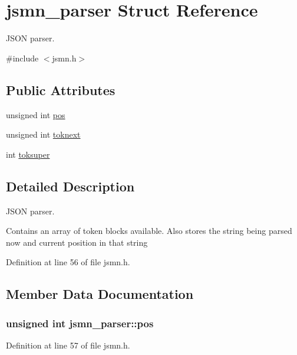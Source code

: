 \hypertarget{structjsmn__parser}{\section{jsmn\-\_\-parser Struct Reference}
\label{structjsmn__parser}
}


J\-S\-O\-N parser.  




{\ttfamily \#include $<$jsmn.\-h$>$}

\subsection*{Public Attributes}
\begin{DoxyCompactItemize}
\item 
unsigned int \hyperlink{structjsmn__parser_a3d0d6e48d3d5b24262f9e0c2241dc456}{pos}
\item 
unsigned int \hyperlink{structjsmn__parser_af640efd7d154218124a964b65f114bff}{toknext}
\item 
int \hyperlink{structjsmn__parser_af11fcec48d9f1298909777a12f1d1e39}{toksuper}
\end{DoxyCompactItemize}


\subsection{Detailed Description}
J\-S\-O\-N parser. 

Contains an array of token blocks available. Also stores the string being parsed now and current position in that string 

Definition at line 56 of file jsmn.\-h.



\subsection{Member Data Documentation}
\hypertarget{structjsmn__parser_a3d0d6e48d3d5b24262f9e0c2241dc456}{
\subsubsection[{pos}]{\setlength{\rightskip}{0pt plus 5cm}unsigned int jsmn\-\_\-parser\-::pos}}\label{structjsmn__parser_a3d0d6e48d3d5b24262f9e0c2241dc456}


Definition at line 57 of file jsmn.\-h.

